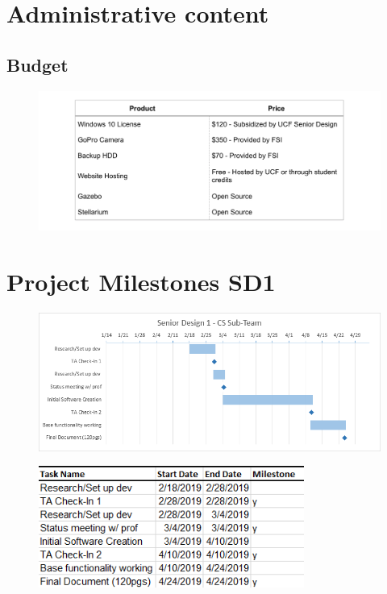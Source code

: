 \documentclass[12pt]{article}
\begin{document}
\clearpage

\section{Administrative content}

\subsection{Budget}

\begin{figure}[h]
	\centering
	\includegraphics[width=\linewidth]{budgettable}
\end{figure}

\section{Project Milestones SD1}

\begin{figure}[h]
	\centering
	\includegraphics[width=\linewidth]{SD1Gantt}
\end{figure}

\newpage

\begin{figure}[h]
	\centering
	\includegraphics[width=0.6\linewidth, height=4.0cm]{SD1Dates}
\end{figure}
\end{document}
